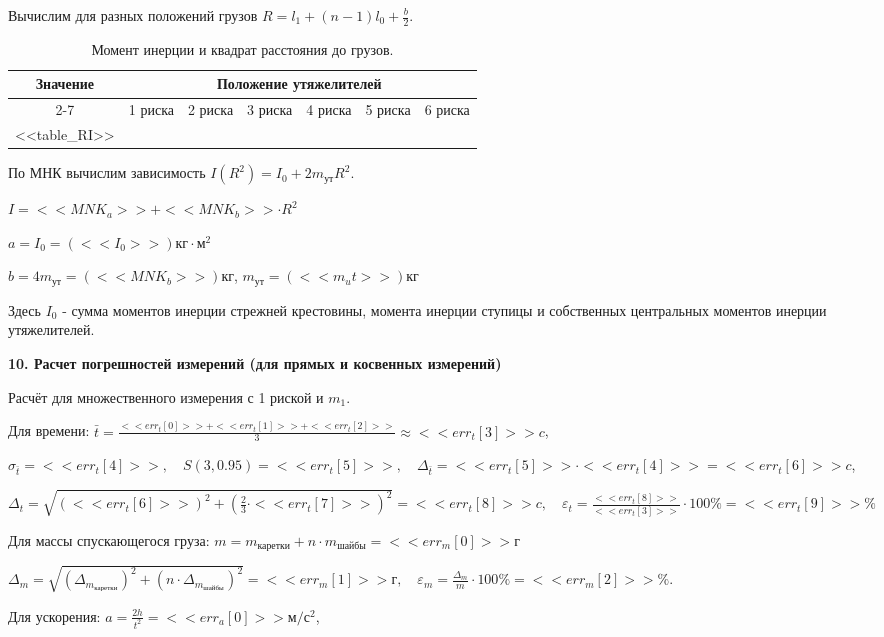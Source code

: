 \documentclass[14pt]{extreport}
\begin{document}
Вычислим для разных положений грузов $R = l_1 + (n - 1)l_0 + \frac{b}{2}$.

\begin{table}[H]
\centering
\caption{Момент инерции и квадрат расстояния до грузов.}
\label{tab:indirect3104}
\begin{tabular}{|c|c|c|c|c|c|c|}
\hline
\multirow{3}{*}{\textbf{Значение}} & 
\multicolumn{6}{c|}{\textbf{Положение утяжелителей}} \\ \cline{2-7}
& 1 риска & 2 риска & 3 риска & 4 риска & 5 риска & 6 риска \\ \hline
<<table_RI>>
\end{tabular}
\end{table}

По МНК вычислим зависимость $I(R^2) = I_0+2m_\text{ут}R^2$.

\centerline{$I = <<MNK_a>>+<<MNK_b>> \cdot R^2$}

$a = I_0 = (<<I_0>>) \text{кг}\cdot\text{м}^2$

$b = 4m_\text{ут} = (<<MNK_b>>) \text{кг}$, $m_\text{ут} = (<<m_ut>>) \text{кг}$

Здесь $I_0$ - сумма моментов инерции стрежней крестовины, момента инерции ступицы и собственных центральных моментов инерции утяжелителей.

\noindent\textbf{10. Расчет погрешностей измерений (для прямых и косвенных измерений)}

Расчёт для множественного измерения с 1 риской и $m_1$.

Для времени: $\bar{t} = \frac{<<err_t[0]>> + <<err_t[1]>> + <<err_t[2]>> }{3} \approx <<err_t[3]>> c$,

\centerline{$\sigma_{\bar{t}} = <<err_t[4]>>, \quad S(3, 0.95)=<<err_t[5]>>, \quad \Delta_{\bar{t}} = <<err_t[5]>> \cdot <<err_t[4]>> = <<err_t[6]>> c$,}

\centerline{$\Delta_{t} = \sqrt{(<<err_t[6]>>)^2 + (\frac{2}{3} \cdot <<err_t[7]>>)^2} = <<err_t[8]>> c, \quad \varepsilon_{t} = \frac{<<err_t[8]>>}{<<err_t[3]>>} \cdot 100\% = <<err_t[9]>>\%$}

Для массы спускающегося груза: $m = m_\text{каретки} + n \cdot m_\text{шайбы} = <<err_m[0]>> \text{г}$

\centerline{$\Delta_m = \sqrt{(\Delta_{m_\text{каретки}})^2 + (n \cdot \Delta_{m_\text{шайбы}})^2} = <<err_m[1]>> \text{г}, \quad \varepsilon_{m} = \frac{\Delta_m}{m} \cdot 100\% = <<err_m[2]>>\%$.}

Для ускорения: $a=\frac{2h}{t^2} = <<err_a[0]>> \text{м}/\text{с}^2$, 
\end{document}
